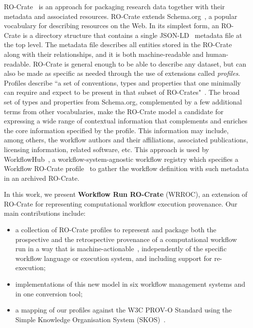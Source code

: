 RO-Crate~\cite{Soiland-Reyes 2022a} is an approach for packaging research data together with their metadata and associated resources. RO-Crate extends Schema.org~\cite{Guha 2015}, a popular vocabulary for describing resources on the Web.
In its simplest form, an RO-Crate is a directory structure that contains a single JSON-LD~\cite{w3-json-ld} metadata file at the top level.
The metadata file describes all entities stored in the RO-Crate along with their relationships, and it is both machine-readable and human-readable.
RO-Crate is general enough to be able to describe any dataset, but can also be made as specific as needed through the use of extensions called \emph{profiles}. Profiles describe ``a set of conventions, types and properties that one minimally can require and expect to be present in that subset of RO-Crates"~\cite{profiles-ro-crate}. 
The broad set of types and properties from Schema.org, complemented by a few additional terms from other vocabularies, make the RO-Crate model a candidate for expressing a wide range of contextual information that complements and enriches the core information specified by the profile.
This information may include, among others, the workflow authors and their affiliations, associated publications, licensing information, related software, etc.
This approach is used by WorkflowHub~\cite{Goble 2021}, a workflow-system-agnostic workflow registry which specifies a Workflow RO-Crate profile~\cite{Bacall 2022} to gather the workflow definition with such metadata in an archived RO-Crate.

In this work, we present \textbf{Workflow Run RO-Crate} (WRROC), an extension of RO-Crate for representing computational workflow execution provenance.
Our main contributions include:
%
\begin{itemize}
\item   a collection of RO-Crate profiles to represent and package both the prospective and the retrospective provenance of a computational workflow run in a way that is machine-actionable~\cite{Batista 2022}, independently of the specific workflow language or execution system, and including support for re-execution;
\item   implementations of this new model in six workflow management systems and in one conversion tool;
\item   a mapping of our profiles against the W3C PROV-O Standard using the Simple Knowledge Organisation System (SKOS)~\cite{Isaac 2009}.
\end{itemize}

